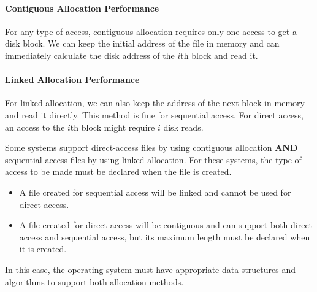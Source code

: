\paragraph{Contiguous Allocation Performance}\label{par:Contiguous_File_Allocation_Performance}
For any type of access, contiguous allocation requires only one access to get a disk block.
We can keep the initial address of the file in memory and can immediately calculate the disk address of the $i$th block and read it.

\paragraph{Linked Allocation Performance}\label{par:Linked_File_Allocation_Performance}
For linked allocation, we can also keep the address of the next block in memory and read it directly.
This method is fine for sequential access.
For direct access, an access to the $i$th block might require $i$ disk reads.

Some systems support direct-access files by using contiguous allocation \textbf{AND} sequential-access files by using linked allocation.
For these systems, the type of access to be made must be declared when the file is created.

\begin{itemize}[noitemsep]
\item A file created for sequential access will be linked and cannot be used for direct access.
\item A file created for direct access will be contiguous and can support both direct access and sequential access, but its maximum length must be declared when it is created.
\end{itemize}

In this case, the operating system must have appropriate data structures and algorithms to support both allocation methods.


